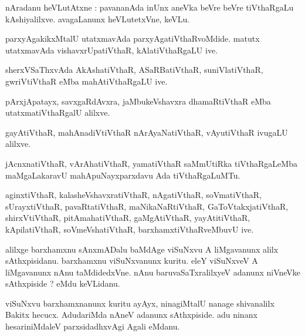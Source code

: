 \documentclass{article}
\begin{document}

\begin{mn}
nAradanu heVLutAtxne : pavananAda inUnx aneVka beVre beVre tiVthaRgaLu kAshiyalilxve. avagaLanunx 
heVLutetxVne, keVLu.
\end{mn}

\begin{mn}
parxyAgakikxMtalU utatxmavAda parxyAgatiVthaRvoMdide. matutx utatxmavAda vishavxrUpatiVthaR,
kAlatiVthaRgaLU ive.
\end{mn}

\begin{mn}
sherxVSaThxvAda AkAshatiVthaR, ASaRBatiVthaR, suniVlatiVthaR, gwriVtiVthaR eMba mahAtiVthaRgaLU ive.
\end{mn}

\begin{mn}
pArxjApatayx, savxgaRdAvxra, jaMbukeVshavxra dhamaRtiVthaR eMba utatxmatiVthaRgalU alilxve.
\end{mn}

\begin{mn}
gayAtiVthaR, mahAnadiVtiVthaR nArAyaNatiVthaR, vAyutiVthaR ivugaLU alilxve.
\end{mn}

\begin{mn}
jAcnxnatiVthaR, vArAhatiVthaR, yamatiVthaR saMmUtiRka tiVthaRgaLeMba maMgaLakaravU 
mahApuNayxparxdavu Ada tiVthaRgaLuMTu.
\end{mn}

\begin{mn}
aginxtiVthaR, kalasheVshavxratiVthaR, nAgatiVthaR, soVmatiVthaR, sUrayxtiVthaR, pavaRtatiVthaR,
maNikaNaRtiVthaR, GaToVtakxjatiVthaR, shirxVtiVthaR, pitAmahatiVthaR, gaMgAtiVthaR, yayAtitiVthaR, 
kApilatiVthaR, soVmeVshatiVthaR, barxhamxtiVthaRveMbuvU ive.
\end{mn}

\begin{mn}
alilxge barxhamxnu sAnxmADalu baMdAge viSuNxvu A liMgavanunx alilx sAthxpisidanu. barxhamxnu 
viSuNxvanunx kuritu. eleY viSuNxveV A liMgavanunx nAnu taMdidedxVne. nAnu baruvaSaTxralilxyeV 
adanunx niVneVke sAthxpiside ? eMdu keVLidanu.
\end{mn}

\begin{mn}
viSuNxvu barxhamxnanunx kuritu ayAyx, ninagiMtalU nanage shivanalilx Bakitx hecucx. AdudariMda 
nAneV adanunx sAthxpiside. adu ninanx hesariniMdaleV parxsidadhxvAgi Agali eMdanu.
\end{mn}
\end{document}
